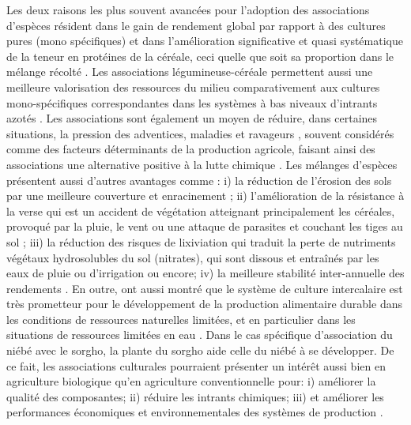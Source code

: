 \documentclass[a4paper,11pt]{article}
\begin{document}
Les deux raisons les plus souvent avancées pour l'adoption des
associations d'espèces résident dans le gain de rendement global par
rapport à des cultures pures (mono spécifiques) et dans l'amélioration
significative et quasi systématique de la teneur en protéines de la
céréale, ceci quelle que soit sa proportion dans le mélange récolté
\cite{Jensen_1996}. Les associations légumineuse-céréale permettent
aussi une meilleure valorisation des ressources du milieu
comparativement aux cultures mono-spécifiques correspondantes dans les
systèmes à bas niveaux d'intrants azotés \cite{Bedoussac_2010}. Les
associations sont également un moyen de réduire, dans certaines
situations, la pression des adventices, maladies et ravageurs
\cite{Altieri_1999}, souvent considérés comme des facteurs
déterminants de la production agricole, faisant ainsi des associations
une alternative positive à la lutte chimique
\cite{Hauggaard_2001}. Les mélanges d'espèces présentent aussi
d'autres avantages comme : i) la réduction de l'érosion des sols par
une meilleure couverture et enracinement \cite{Zougmore_1998}; ii)
l'amélioration de la résistance à la verse qui est un accident de
végétation atteignant principalement les céréales, provoqué par la
pluie, le vent ou une attaque de parasites et couchant les tiges au
sol \cite{Anil_1998}; iii) la réduction des risques de lixiviation qui
traduit la perte de nutriments végétaux hydrosolubles du sol
(nitrates), qui sont dissous et entraînés par les eaux de pluie ou
d'irrigation \cite{CorreHellou_2005} ou encore; iv) la meilleure
stabilité inter-annuelle des rendements \cite{Lithourgidis_2006}. En
outre, \citeauthor{Chu_2004} \citeyear{Chu_2004} ont aussi montré que
le système de culture intercalaire est très prometteur pour le
développement de la production alimentaire durable dans les conditions
de ressources naturelles limitées, et en particulier dans les
situations de ressources limitées en eau \cite{Tsubo_2005}. Dans le
cas spécifique d'association du niébé avec le sorgho, la plante du
sorgho aide celle du niébé à se développer. De ce fait, les
associations culturales pourraient présenter un intérêt aussi bien en
agriculture biologique qu'en agriculture conventionnelle pour: i)
améliorer la qualité des composantes; ii) réduire les intrants
chimiques; iii) et améliorer les performances économiques et
environnementales des systèmes de production
\cite{Koulibi_FideleZONGO}.

\end{document}
